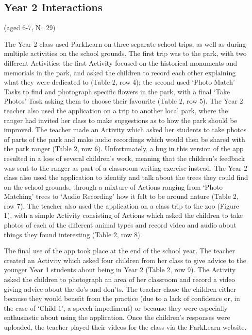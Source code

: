 \subsection{Year 2 Interactions}
(aged 6-7, N=29)

The Year 2 class used ParkLearn on three separate school trips, as well as during multiple activities on the school grounds. The first trip was to the park, with two different Activities: the first Activity focused on the historical monuments and memorials in the park, and asked the children to record each other explaining what they were dedicated to (Table 2, row 4); the second used ‘Photo Match’ Tasks to find and photograph specific flowers in the park, with a final ‘Take Photos’ Task asking them to choose their favourite (Table 2, row 5). The Year 2 teacher also used the application on a trip to another local park, where the ranger had invited her class to make suggestions as to how the park should be improved. The teacher made an Activity which asked her students to take photos of parts of the park and make audio recordings which would then be shared with the park ranger (Table 2, row 6). Unfortunately, a bug in this version of the app resulted in a loss of several children’s work, meaning that the children’s feedback was sent to the ranger as part of a classroom writing exercise instead. The Year 2 class also used the application to identify and talk about the trees they could find on the school grounds, through a mixture of Actions ranging from ‘Photo Matching’ trees to ‘Audio Recording’ how it felt to be around nature (Table 2, row 7). The teacher also used the application on a class trip to the zoo (Figure 1), with a simple Activity consisting of Actions which asked the children to take photos of each of the different animal types and record video and audio about things they found interesting (Table 2, row 8).

The final use of the app took place at the end of the school year. The teacher created an Activity which asked four children from her class to give advice to the younger Year 1 students about being in Year 2 (Table 2, row 9). The Activity asked the children to photograph an area of her classroom and record a video giving advice about the do’s and don’ts. The teacher chose the children either because they would benefit from the practice (due to a lack of confidence or, in the case of ‘Child 1’, a speech impediment) or because they were especially enthusiastic about using the application. Once the children’s responses were uploaded, the teacher played their videos for the class via the ParkLearn website.

